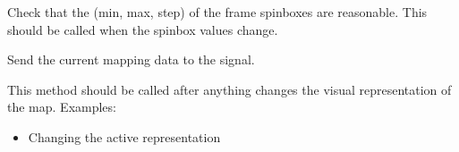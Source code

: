\documentclass[letterpaper,10pt,english]{sphinxmanual}
\begin{document}
\begin{fulllineitems}
\begin{fulllineitems}
\label{\detokenize{xanespy:xanespy.qt_frameset_presenter.QtFramesetPresenter.timer}}
\end{fulllineitems}


\begin{fulllineitems}
\label{\detokenize{xanespy:xanespy.qt_frameset_presenter.QtFramesetPresenter.toggle_edge_mask}}
\end{fulllineitems}


\begin{fulllineitems}
\label{\detokenize{xanespy:xanespy.qt_frameset_presenter.QtFramesetPresenter.update_frame_range_limits}}
Check that the (min, max, step) of the frame spinboxes are
reasonable. This should be called when the spinbox values change.

\end{fulllineitems}


\begin{fulllineitems}
\label{\detokenize{xanespy:xanespy.qt_frameset_presenter.QtFramesetPresenter.update_map_limits}}
\end{fulllineitems}


\begin{fulllineitems}
\label{\detokenize{xanespy:xanespy.qt_frameset_presenter.QtFramesetPresenter.update_maps}}
Send the current mapping data to the  signal.

This method should be called after anything changes the visual
representation of the map. Examples:
\begin{itemize}
\item {} 
Changing the active representation


\end{itemize}
\end{fulllineitems}
\end{fulllineitems}
\end{document}
